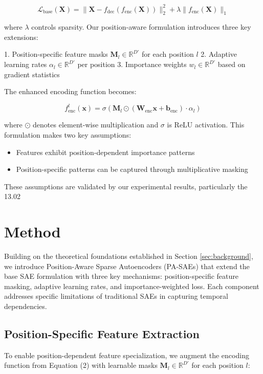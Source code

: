 \documentclass{article} %
\begin{document}
\begin{equation}
    \mathcal{L}_{\text{base}}(\mathbf{X}) = \|\mathbf{X} - f_{\text{dec}}(f_{\text{enc}}(\mathbf{X}))\|_2^2 + \lambda\|f_{\text{enc}}(\mathbf{X})\|_1
\end{equation}

where $\lambda$ controls sparsity. Our position-aware formulation introduces three key extensions:

1. Position-specific feature masks $\mathbf{M}_l \in \mathbb{R}^{D'}$ for each position $l$
2. Adaptive learning rates $\alpha_l \in \mathbb{R}^{D'}$ per position
3. Importance weights $w_l \in \mathbb{R}^{D'}$ based on gradient statistics

The enhanced encoding function becomes:

\begin{equation}
    f_{\text{enc}}^l(\mathbf{x}) = \sigma(\mathbf{M}_l \odot (\mathbf{W}_{\text{enc}}\mathbf{x} + \mathbf{b}_{\text{enc}}) \cdot \alpha_l)
\end{equation}

where $\odot$ denotes element-wise multiplication and $\sigma$ is ReLU activation. This formulation makes two key assumptions:

\begin{itemize}
    \item Features exhibit position-dependent importance patterns
    \item Position-specific patterns can be captured through multiplicative masking
\end{itemize}

These assumptions are validated by our experimental results, particularly the 13.02%

\section{Method}
\label{sec:method}

Building on the theoretical foundations established in Section \ref{sec:background}, we introduce Position-Aware Sparse Autoencoders (PA-SAEs) that extend the base SAE formulation with three key mechanisms: position-specific feature masking, adaptive learning rates, and importance-weighted loss. Each component addresses specific limitations of traditional SAEs in capturing temporal dependencies.

\subsection{Position-Specific Feature Extraction}
To enable position-dependent feature specialization, we augment the encoding function from Equation (2) with learnable masks $\mathbf{M}_l \in \mathbb{R}^{D'}$ for each position $l$:
\end{document}
